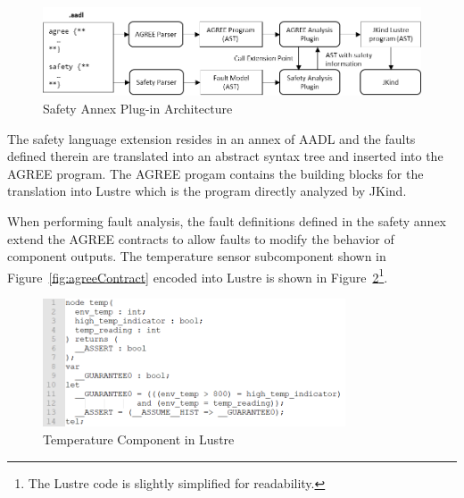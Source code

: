 \begin{figure}[h]
	\begin{center}
		\includegraphics[width=\textwidth]{images/arch.png}
	\end{center}
	\caption{Safety Annex Plug-in Architecture}
	\label{fig:plugin-arch}
\end{figure}

The safety language extension resides in an annex of AADL and the faults defined therein are translated into an abstract syntax tree and inserted into the AGREE program. The AGREE progam contains the building blocks for the translation into Lustre which is the program directly analyzed by JKind.  

When performing fault analysis, the fault definitions defined in the safety annex extend the AGREE contracts to allow faults to modify the behavior of component outputs. The temperature sensor subcomponent shown in Figure~\ref{fig:agreeContract} encoded into Lustre is shown in Figure~\ref{fig:lustreTempNode}\footnote{The Lustre code is slightly simplified for readability.}.

\begin{figure}[h]
	\begin{center}
		\includegraphics[width=0.8\textwidth]{images/lustreTempNode.png}
	\end{center}
	\caption{Temperature Component in Lustre}
	\label{fig:lustreTempNode}
\end{figure}

